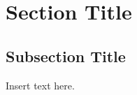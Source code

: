 \documentclass{cheatsheet}
\author{ehaller, seyohnp}
\begin{document}
    \section*{Section Title}
    \subsection*{Subsection Title}
        Insert text here.
\end{document}
